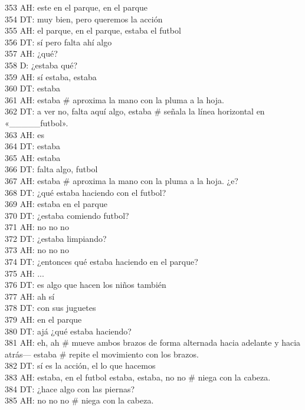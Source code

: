 353 AH: este en el parque, en el parque\\
354 DT: muy bien, pero queremos la acción\\
355 AH: el parque, en el parque, estaba el futbol\\
356 DT: sí pero falta ahí algo\\
357 AH: ¿qué?\\
358 D: ¿estaba qué?\\
359 AH: sí estaba, estaba\\
360 DT: estaba\\
361 AH: estaba \# aproxima la mano con la pluma a la hoja.\\
362 DT: a ver no, falta aquí algo, estaba \# señala la línea horizontal en «\_\_\_\_\_futbol».\\
363 AH: es\\
364 DT: estaba\\
365 AH: estaba\\
366 DT: falta algo, futbol\\
367 AH: estaba \# aproxima la mano con la pluma a la hoja. ¿e?\\
368 DT: ¿qué estaba haciendo con el futbol?\\
369 AH: estaba en el parque\\
370 DT: ¿estaba comiendo futbol?\\
371 AH: no no no\\
372 DT: ¿estaba limpiando?\\
373 AH: no no no\\
374 DT: ¿entonces qué estaba haciendo en el parque?\\
375 AH: ...\\
376 DT: es algo que hacen los niños también\\
377 AH: ah sí\\
378 DT: con sus juguetes\\
379 AH: en el parque\\
380 DT: ajá ¿qué estaba haciendo?\\
381 AH: eh, ah \# mueve ambos brazos de forma alternada hacia adelante y hacia atrás--- estaba \# repite el movimiento con los brazos.\\
382 DT: sí es la acción, el lo que hacemos\\
383 AH: estaba, en el futbol estaba, estaba, no no \# niega con la cabeza.\\
384 DT: ¿hace algo con las piernas?\\
385 AH: no no no \# niega con la cabeza.\\
